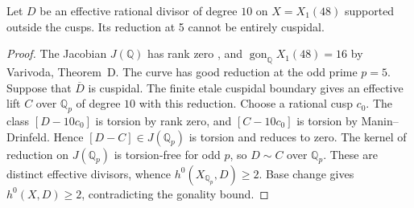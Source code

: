 \begin{lemma}
Let $D$ be an effective rational divisor of degree $10$ on
$X=X_1(48)$ supported outside the cusps.
Its reduction at 5 cannot be entirely cuspidal.
\end{lemma}
\begin{proof}
The Jacobian $J(\mathbb Q)$ has rank zero
\cite[Theorem~3.1(2)]{DEHMZ}, and $\operatorname{gon}_{\mathbb Q}X_1(48)=16$ by Varivoda, Theorem~D.
The curve has good reduction at the odd prime $p=5$.
Suppose that $\overline D$ is cuspidal. The finite etale cuspidal
boundary gives an effective lift $C$ over $\mathbb Q_p$ of degree
$10$ with this reduction. Choose a rational cusp $c_0$.
The class $[D-10c_0]$ is torsion by rank zero, and
$[C-10c_0]$ is torsion by Manin--Drinfeld. Hence
$[D-C]\in J(\mathbb Q_p)$ is torsion and reduces to zero.
The kernel of reduction on $J(\mathbb Q_p)$ is torsion-free
for odd $p$, so $D\sim C$ over $\mathbb Q_p$.
These are distinct effective divisors, whence
$h^0(X_{\mathbb Q_p},D)\geq2$. Base change gives
$h^0(X,D)\geq2$, contradicting the gonality bound.
\end{proof}

